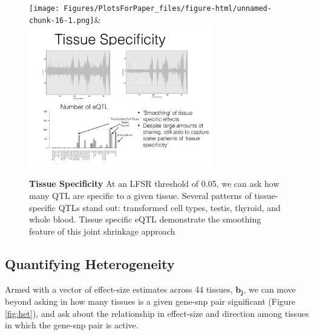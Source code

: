 \newline
\begin{figure}[htbp]
\begin{center}
\texttt{[image: Figures/PlotsForPaper\_files/figure-html/unnamed-chunk-16-1.png]}&
\includegraphics[width=8cm]{Figures/tspecsmooth.pdf}
\end{center}
\caption{\textbf{Tissue Specificity} At an LFSR threshold of 0.05, we can ask how many QTL are specific to a given tissue. Several patterns of tissue-specific QTLs stand out: transformed cell types, testis, thyroid, and whole blood. Tissue specific eQTL demonstrate the smoothing feature of this joint shrinkage approach}
\label{fig:tspec}
\end{figure}\newline




\subsection{Quantifying Heterogeneity}


Armed with a vector of effect-size estimates across 44 tissues, $\bm{b_{j}}$, we can move beyond asking in how many tissues is a given gene-snp pair significant (Figure \ref{fig:het}), and ask about the relationship in effect-size and direction among tissues in which the gene-snp pair is active.


